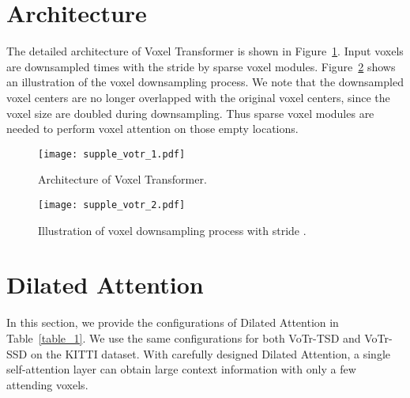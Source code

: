 \documentclass[10pt,twocolumn,letterpaper]{article}
\begin{document}
{\small


}
\clearpage
\appendix

\section{Architecture}
The detailed architecture of Voxel Transformer is shown in Figure~\ref{fig_achitect}. Input voxels are downsampled  times with the stride  by  sparse voxel modules. Figure~\ref{fig_downsample} shows an illustration of the voxel downsampling process. We note that the downsampled voxel centers are no longer overlapped with the original voxel centers, since the voxel size are doubled during downsampling. Thus sparse voxel modules are needed to perform voxel attention on those empty locations.  

\begin{figure}[!t]
\centering
\texttt{[image: supple\_votr\_1.pdf]}
\caption{Architecture of Voxel Transformer.}
\label{fig_achitect}
\end{figure}

\begin{figure}[!t]
\centering
\texttt{[image: supple\_votr\_2.pdf]}
\caption{Illustration of voxel downsampling process with stride .}
\label{fig_downsample}
\end{figure}

\section{Dilated Attention}
In this section, we provide the configurations of Dilated Attention in Table~\ref{table_1}. We use the same configurations for both VoTr-TSD and VoTr-SSD on the KITTI dataset. With carefully designed Dilated Attention, a single self-attention layer can obtain large context information with only a few attending voxels.  
\end{document}

